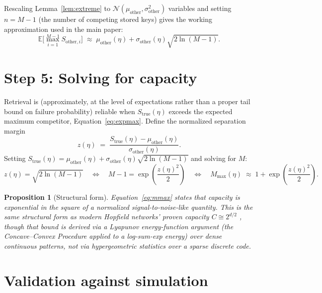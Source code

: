 \documentclass[11pt]{article}
\newtheorem{proposition}{Proposition}
\begin{document}
Rescaling Lemma~\ref{lem:extreme} to $\mathcal{N}(\mu_{\text{other}},\sigma_{\text{other}}^2)$
variables and setting $n = M-1$ (the number of competing stored keys) gives the working
approximation used in the main paper:
\begin{equation}
\mathbb{E}\Big[\max_{i=1}^{M-1} S_{\text{other},i}\Big] \;\approx\; \mu_{\text{other}}(\eta) + \sigma_{\text{other}}(\eta)\sqrt{2\ln(M-1)}.
\label{eq:expmax}
\end{equation}

\section{Step 5: Solving for capacity}
\label{sec:step5}

Retrieval is (approximately, at the level of expectations rather than a proper tail bound on
failure probability) reliable when $S_{\text{true}}(\eta)$ exceeds the expected maximum
competitor, Equation~\ref{eq:expmax}. Define the normalized separation margin
\begin{equation}
z(\eta) \;=\; \frac{S_{\text{true}}(\eta) - \mu_{\text{other}}(\eta)}{\sigma_{\text{other}}(\eta)}.
\label{eq:margin}
\end{equation}
Setting $S_{\text{true}}(\eta) = \mu_{\text{other}}(\eta) + \sigma_{\text{other}}(\eta)\sqrt{2\ln(M-1)}$
and solving for $M$:
\begin{equation}
z(\eta) = \sqrt{2\ln(M-1)} \quad\Longleftrightarrow\quad M-1 = \exp\!\left(\frac{z(\eta)^2}{2}\right)
\quad\Longleftrightarrow\quad
\boxed{M_{\max}(\eta) \;\approx\; 1 + \exp\!\left(\frac{z(\eta)^2}{2}\right).}
\label{eq:mmax}
\end{equation}

\begin{proposition}[Structural form]
Equation~\ref{eq:mmax} states that capacity is exponential in the \emph{square} of a
normalized signal-to-noise-like quantity. This is the same structural form as modern Hopfield
networks' proven capacity $C \cong 2^{d/2}$ \cite{ramsauer2020}, though that bound is derived
via a Lyapunov energy-function argument (the Concave--Convex Procedure applied to a
log-sum-exp energy) over dense continuous patterns, not via hypergeometric statistics over a
sparse discrete code.
\end{proposition}

\section{Validation against simulation}
\label{sec:validation}
\end{document}
